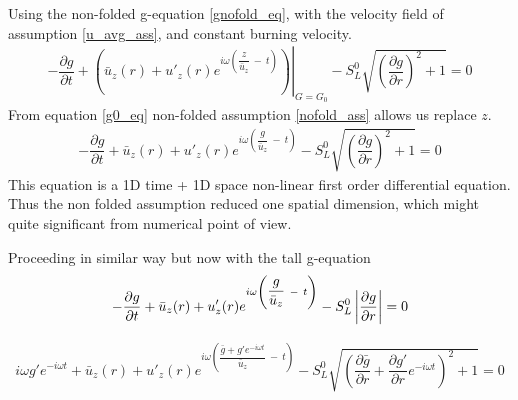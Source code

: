 \begin{theorem}
Using the non-folded g-equation \eqref{gnofold_eq}, with the velocity field of assumption \ref{u_avg_ass}, and constant burning velocity. 
\begin{align*}
	-\dfrac{\partial g}{\partial t}  +   \left. \left(\bar{u}_z(r) + u'_z(r)e^{i\omega\left(\dfrac{z}{\bar{u}_z}\ -\ t\right)} \right)\right|_{G=G_0} - S_L^0 \sqrt{ \left(\dfrac{\partial g}{\partial r}\right)^2 +1 }=0
\end{align*}
From equation \eqref{g0_eq} non-folded assumption \ref{nofold_ass} allows us replace $z$.
\begin{align}
	-\dfrac{\partial g}{\partial t}  +  \bar{u}_z(r) + u'_z(r)e^{i\omega\left(\dfrac{g}{\bar{u}_z}\ -\ t\right)}- S_L^0 \sqrt{ \left(\dfrac{\partial g}{\partial r}\right)^2 +1 }=0
\end{align}
This equation is a 1D time + 1D space non-linear first order differential equation. Thus the non folded assumption reduced one spatial dimension, which might quite significant from numerical point of view.
\end{theorem}

\begin{theorem}
Proceeding in similar way but now with the tall g-equation
\begin{align}
	-\dfrac{\partial g}{\partial t}  +  \bar{u}_z(r) + u'_z(r)e^{i\omega\left(\dfrac{g}{\bar{u}_z}\ -\ t\right)}- S_L^0 \left|\dfrac{\partial g}{\partial r}\right|=0
\end{align}
\end{theorem}


\begin{theorem}
\begin{align}
	i \omega g' e^{-i\omega t} +   \bar{u}_z(r) + u'_z(r)e^{i\omega\left(\dfrac{\bar{g}+ g'e^{-i\omega t}}{\bar{u}_z}\ -\ t\right)}- S_L^0 \sqrt{ \left(  \dfrac{\partial \bar{g}}{\partial r} + \dfrac{\partial g'}{\partial r} e^{-i \omega t} \right)^2 +1 }=0 
\end{align}
\end{theorem}



